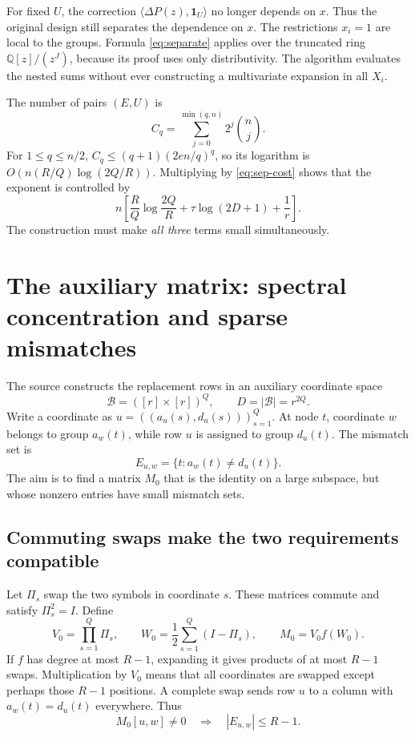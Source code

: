 \documentclass[11pt,a4paper]{article}
\numberwithin{equation}{section}
\theoremstyle{definition}
\theoremstyle{remark}
\newcommand{\Q}{\mathbb Q}
\newcommand{\one}{\mathbf 1}
\begin{document}
For fixed $U$, the correction $\langle\Delta P(z),\one_U\rangle$ no longer
depends on $x$. Thus the original design still separates the dependence on
$x$. The restrictions $x_i=1$ are local to the groups. Formula
\eqref{eq:separate} applies over the truncated ring $\Q[z]/(z^J)$, because
its proof uses only distributivity. The algorithm evaluates the nested sums
without ever constructing a multivariate expansion in all $X_i$.

The number of pairs $(E,U)$ is
\begin{equation}\label{eq:taylorcount}
 C_q=\sum_{j=0}^{\min(q,n)}2^j\binom nj.
\end{equation}
For $1\le q\le n/2$,
$C_q\le(q+1)(2en/q)^q$, so its logarithm is
$O(n(R/Q)\log(2Q/R))$. Multiplying by \eqref{eq:sep-cost} shows that the
exponent is controlled by
\begin{equation}\label{eq:threecosts}
 n\left[\frac RQ\log\frac{2Q}{R}
             +\tau\log(2D+1)+\frac1r\right].
\end{equation}
The construction must make \emph{all three} terms small simultaneously.

\section{The auxiliary matrix: spectral concentration and sparse mismatches}
\label{sec:matrix}
The source constructs the replacement rows in an auxiliary coordinate space
\[
 \mathcal B=([r]\times[r])^Q,
 \qquad D=|\mathcal B|=r^{2Q}.
\]
Write a coordinate as $u=((a_u(s),d_u(s)))_{s=1}^Q$. At node $t$, coordinate
$w$ belongs to group $a_w(t)$, while row $u$ is assigned to group $d_u(t)$.
The mismatch set is
\[
 E_{u,w}=\{t:a_w(t)\ne d_u(t)\}.
\]
The aim is to find a matrix $M_0$ that is the identity on a large subspace,
but whose nonzero entries have small mismatch sets.

\subsection{Commuting swaps make the two requirements compatible}
Let $\Pi_s$ swap the two symbols in coordinate $s$. These matrices commute
and satisfy $\Pi_s^2=I$. Define
\[
 V_0=\prod_{s=1}^Q\Pi_s,\qquad
 W_0=\frac12\sum_{s=1}^Q(I-\Pi_s),\qquad M_0=V_0f(W_0).
\]
If $f$ has degree at most $R-1$, expanding it gives products of at most
$R-1$ swaps. Multiplication by $V_0$ means that all coordinates are swapped
except perhaps those $R-1$ positions. A complete swap sends row $u$ to a
column with $a_w(t)=d_u(t)$ everywhere. Thus
\begin{equation}\label{eq:supportmatrix}
 M_0[u,w]\ne0\quad\Longrightarrow\quad |E_{u,w}|\le R-1.
\end{equation}
\end{document}
